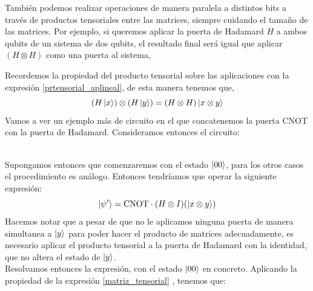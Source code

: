 \documentclass[a4paper]{article}
\numberwithin{equation}{section}
\begin{document}
También podemos realizar operaciones de manera paralela a distintos bits a través de productos tensoriales entre las matrices, siempre cuidando el tamaño de las matrices. Por ejemplo, si queremos aplicar la puerta de Hadamard $H$ a ambos qubits de un sistema de dos qubits, el resultado final será igual que aplicar $(H\otimes H)$ como una puerta al sistema,
\begin{figure}[h]
\centering
{}
\end{figure}
Recordemos la propiedad del producto tensorial sobre las aplicaciones con la expresión \ref{prtensorial_aplineal}, de esta manera tenemos que,
\begin{equation} \label{matriz_tensorial}
(H\ket{x})\otimes(H\ket{y}) = (H\otimes H)\ket{x\otimes y}
\end{equation}
Vamos a ver un ejemplo más de circuito en el que concatenemos la puerta CNOT con la puerta de Hadamard. Consideramos entonces el circuito:
\begin{figure}[h]
\centering
{}
\end{figure}\\
Supongamos entonces que comenzaremos con el estado $\ket{00}$, para los otros casos el procedimiento es análogo. Entonces tendríamos que operar la siguiente expresión:
\begin{equation}
\ket{\psi'} = \textrm{CNOT}\cdot(H\otimes I)(\ket{x\otimes y})
\end{equation}
Hacemos notar que a pesar de que no le aplicamos ninguna puerta de manera simultanea a $\ket{y}$ para poder hacer el producto de matrices adecuadamente, es necesario aplicar el producto tensorial a la puerta de Hadamard con la identidad, que no altera el estado de $\ket{y}$.\\
Resolvamos entonces la expresión, con el estado $\ket{00}$ en concreto. Aplicando la propiedad de la expresión \ref{matriz_tensorial} , tenemos que:
\end{document}
